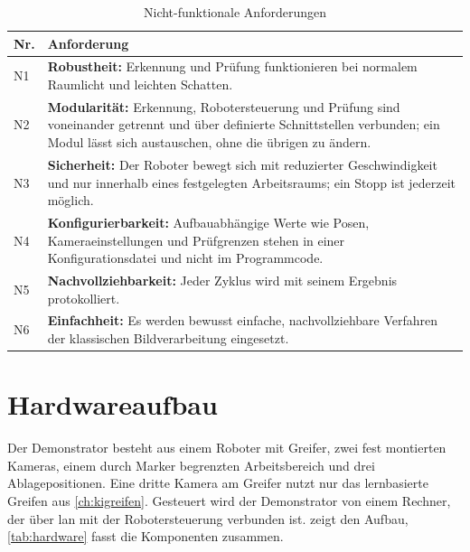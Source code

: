 \begin{table}[htbp]
  \centering
  \caption{Nicht-funktionale Anforderungen}
  \label{tab:anf-nichtfunktional}
  \begin{tabularx}{\textwidth}{@{}lX@{}}
    \toprule
    Nr. & Anforderung \\
    \midrule
    N1 & \textbf{Robustheit:} Erkennung und Prüfung funktionieren bei normalem Raumlicht und
         leichten Schatten. \\
    N2 & \textbf{Modularität:} Erkennung, Robotersteuerung und Prüfung sind voneinander
         getrennt und über definierte Schnittstellen verbunden; ein Modul lässt sich
         austauschen, ohne die übrigen zu ändern. \\
    N3 & \textbf{Sicherheit:} Der Roboter bewegt sich mit reduzierter Geschwindigkeit und nur
         innerhalb eines festgelegten Arbeitsraums; ein Stopp ist jederzeit möglich. \\
    N4 & \textbf{Konfigurierbarkeit:} Aufbauabhängige Werte wie Posen, Kameraeinstellungen und
         Prüfgrenzen stehen in einer Konfigurationsdatei und nicht im Programmcode. \\
    N5 & \textbf{Nachvollziehbarkeit:} Jeder Zyklus wird mit seinem Ergebnis protokolliert. \\
    N6 & \textbf{Einfachheit:} Es werden bewusst einfache, nachvollziehbare Verfahren der
         klassischen Bildverarbeitung eingesetzt. \\
    \bottomrule
  \end{tabularx}
\end{table}

\section{Hardwareaufbau}
\label{sec:hardware}

Der Demonstrator besteht aus einem Roboter mit Greifer, zwei fest montierten Kameras,
einem durch Marker begrenzten Arbeitsbereich und drei Ablagepositionen. Eine dritte Kamera am
Greifer nutzt nur das lernbasierte Greifen aus \cref{ch:kigreifen}. Gesteuert wird der
Demonstrator von einem Rechner, der über \ac{lan} mit der Robotersteuerung verbunden ist.
 zeigt den Aufbau, \cref{tab:hardware} fasst die Komponenten zusammen.

